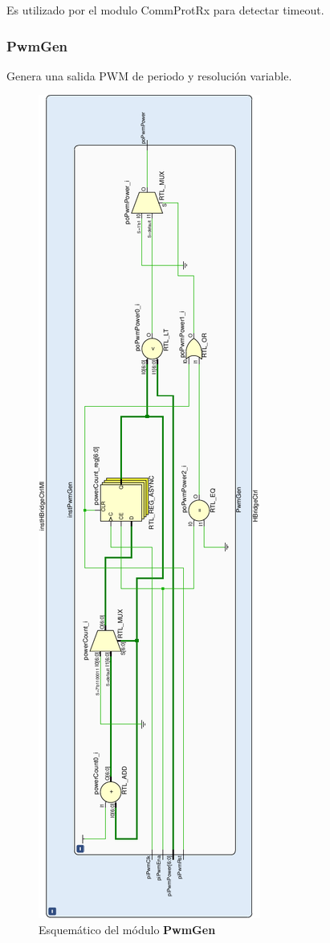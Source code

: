 \documentclass[12pt]{article}
\begin{document}
Es utilizado por el modulo CommProtRx para detectar timeout.

\subsubsection{PwmGen}
Genera una salida PWM de periodo y resolución variable.
\begin{figure}[H]
    \centering
    \includegraphics[angle=270, width=\textwidth]{PwmGen-crop}
    \caption{Esquemático del módulo \textbf{PwmGen}}
\end{figure}
\end{document}
